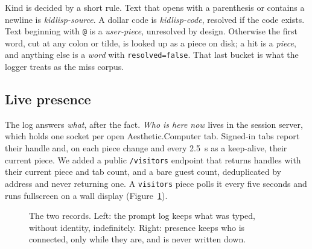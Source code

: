 \documentclass[10pt,letterpaper,twocolumn]{article}
\newcommand{\acdot}{{\color{acpink}.}}
\newcommand{\ac}{Aesthetic{\acdot}Computer}
\newcommand{\code}[1]{\texttt{#1}}
\begin{document}
Kind is decided by a short rule. Text that opens with a parenthesis or
contains a newline is \emph{kidlisp-source}. A dollar code is
\emph{kidlisp-code}, resolved if the code exists. Text beginning with
\code{@} is a \emph{user-piece}, unresolved by design. Otherwise the first
word, cut at any colon or tilde, is looked up as a piece on disk; a hit is a
\emph{piece}, and anything else is a \emph{word} with \code{resolved=false}.
That last bucket is what the logger treats as the miss corpus.

\subsection{Live presence}
\label{sec:presence}

The log answers \emph{what}, after the fact. \emph{Who is here now} lives in
the session server, which holds one socket per open \ac{} tab. Signed-in tabs
report their handle and, on each piece change and every 2.5~s as a
keep-alive, their current piece. We added a public \code{/visitors} endpoint
that returns handles with their current piece and tab count, and a bare guest
count, deduplicated by address and never returning one. A \code{visitors}
piece polls it every five seconds and runs fullscreen on a wall display
(Figure~\ref{fig:flow}).

\begin{figure}[t]
\centering
{}
\caption{The two records. Left: the prompt log keeps what was typed, without
identity, indefinitely. Right: presence keeps who is connected, only while they
are, and is never written down.}
\label{fig:flow}
\end{figure}
\end{document}
